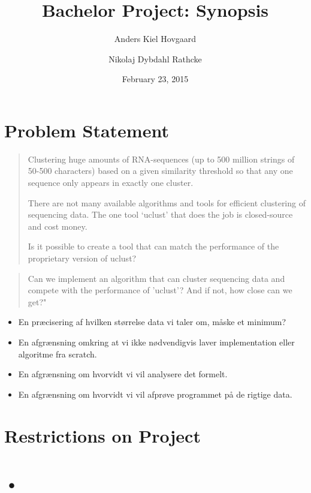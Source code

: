 \documentclass[12pt,a4paper]{article}
\title{Bachelor Project: Synopsis}
\author{Anders Kiel Hovgaard \and Nikolaj Dybdahl Rathcke}
\date{February 23, 2015}
\begin{document}
\maketitle

\section{Problem Statement}
\begin{quotation}
  Clustering huge amounts of RNA-sequences (up to 500 million strings of 50-500
  characters) based on a given similarity threshold so that any one sequence only
  appears in exactly one cluster.
   
  There are not many available algorithms and tools for efficient clustering of
  sequencing data. The one tool ‘uclust’ that does the job is closed-source and
  cost money.
   
  Is it possible to create a tool that can match the performance of the
  proprietary version of uclust?
\end{quotation}


\begin{quotation}
  Can we implement an algorithm that can cluster sequencing data and compete
  with the performance of 'uclust'? And if not, how close can we get?"
\end{quotation}

\begin{itemize}
  \item En præcisering af hvilken størrelse data vi taler om, måske et minimum?
  \item En afgrænsning omkring at vi ikke nødvendigvis laver implementation
    eller algoritme fra scratch.
  \item En afgrænsning om hvorvidt vi vil analysere det formelt.
  \item En afgrænsning om hvorvidt vi vil afprøve programmet på de rigtige data.
\end{itemize}


\section{Restrictions on Project}


\section{•}
\end{document}
